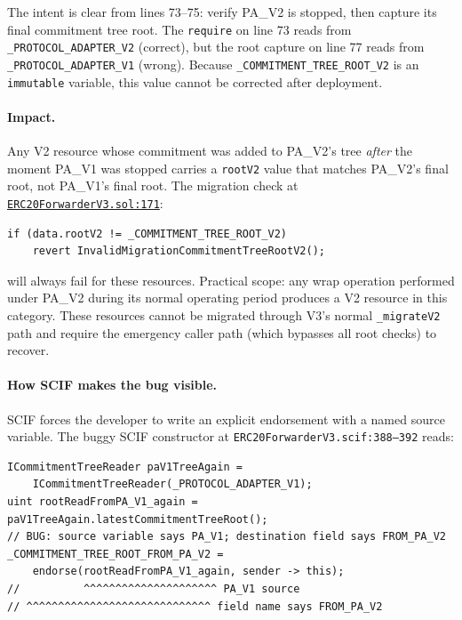 \documentclass[11pt,a4paper]{article}
\newcommand{\fwdRepoRoot}{https://github.com/anoma/anomapay-erc20-forwarder/blob/main/contracts/src}
\newcommand{\fwdref}[3]{\href{\fwdRepoRoot/#1#2\#L#3}{\nolinkurl{#2:#3}}}
\begin{document}
The intent is clear from lines 73--75: verify PA\_V2 is stopped, then capture
its final commitment tree root. The \texttt{require} on line 73 reads from
\texttt{\_PROTOCOL\_ADAPTER\_V2} (correct), but the root capture on line 77
reads from \texttt{\_PROTOCOL\_ADAPTER\_V1} (wrong). Because
\texttt{\_COMMITMENT\_TREE\_ROOT\_V2} is an \texttt{immutable} variable, this
value cannot be corrected after deployment.

\paragraph{Impact.}
Any V2 resource whose commitment was added to PA\_V2's tree \emph{after} the
moment PA\_V1 was stopped carries a \texttt{rootV2} value that matches PA\_V2's
final root, not PA\_V1's final root. The migration check at
\fwdref{drafts/}{ERC20ForwarderV3.sol}{171}:

\begin{lstlisting}[style=soliditystyle,firstnumber=171]
if (data.rootV2 != _COMMITMENT_TREE_ROOT_V2)
    revert InvalidMigrationCommitmentTreeRootV2();
\end{lstlisting}

\noindent will always fail for these resources. Practical scope: any wrap
operation performed under PA\_V2 during its normal operating period produces a
V2 resource in this category. These resources cannot be migrated through V3's
normal \texttt{\_migrateV2} path and require the emergency caller path
(which bypasses all root checks) to recover.

\paragraph{How SCIF makes the bug visible.}
SCIF forces the developer to write an explicit endorsement with a named source
variable. The buggy SCIF constructor at \texttt{ERC20ForwarderV3.scif:388--392}
reads:

\begin{lstlisting}[style=scifstyle,caption={The V3 bug made reviewer-visible in the SCIF model.},firstnumber=369]
ICommitmentTreeReader paV1TreeAgain =
    ICommitmentTreeReader(_PROTOCOL_ADAPTER_V1);
uint rootReadFromPA_V1_again = paV1TreeAgain.latestCommitmentTreeRoot();
// BUG: source variable says PA_V1; destination field says FROM_PA_V2
_COMMITMENT_TREE_ROOT_FROM_PA_V2 =
    endorse(rootReadFromPA_V1_again, sender -> this);
//          ^^^^^^^^^^^^^^^^^^^^^ PA_V1 source
// ^^^^^^^^^^^^^^^^^^^^^^^^^^^^^ field name says FROM_PA_V2
\end{lstlisting}
\end{document}
